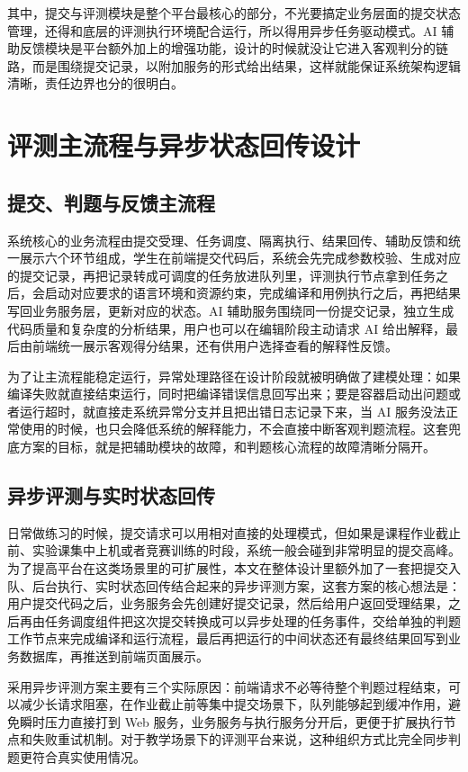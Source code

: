 其中，提交与评测模块是整个平台最核心的部分，不光要搞定业务层面的提交状态管理，还得和底层的评测执行环境配合运行，所以得用异步任务驱动模式。AI 辅助反馈模块是平台额外加上的增强功能，设计的时候就没让它进入客观判分的链路，而是围绕提交记录，以附加服务的形式给出结果，这样就能保证系统架构逻辑清晰，责任边界也分的很明白。

\section{评测主流程与异步状态回传设计}

\subsection{提交、判题与反馈主流程}

系统核心的业务流程由提交受理、任务调度、隔离执行、结果回传、辅助反馈和统一展示六个环节组成，学生在前端提交代码后，系统会先完成参数校验、生成对应的提交记录，再把记录转成可调度的任务放进队列里，评测执行节点拿到任务之后，会启动对应要求的语言环境和资源约束，完成编译和用例执行之后，再把结果写回业务服务层，更新对应的状态。AI 辅助服务围绕同一份提交记录，独立生成代码质量和复杂度的分析结果，用户也可以在编辑阶段主动请求 AI 给出解释，最后由前端统一展示客观得分结果，还有供用户选择查看的解释性反馈。

为了让主流程能稳定运行，异常处理路径在设计阶段就被明确做了建模处理：如果编译失败就直接结束运行，同时把编译错误信息回写出来；要是容器启动出问题或者运行超时，就直接走系统异常分支并且把出错日志记录下来，当 AI 服务没法正常使用的时候，也只会降低系统的解释能力，不会直接中断客观判题流程。这套兜底方案的目标，就是把辅助模块的故障，和判题核心流程的故障清晰分隔开。

\subsection{异步评测与实时状态回传}

日常做练习的时候，提交请求可以用相对直接的处理模式，但如果是课程作业截止前、实验课集中上机或者竞赛训练的时段，系统一般会碰到非常明显的提交高峰。为了提高平台在这类场景里的可扩展性，本文在整体设计里额外加了一套把提交入队、后台执行、实时状态回传结合起来的异步评测方案，这套方案的核心想法是：用户提交代码之后，业务服务会先创建好提交记录，然后给用户返回受理结果，之后再由任务调度组件把这次提交转换成可以异步处理的任务事件，交给单独的判题工作节点来完成编译和运行流程，最后再把运行的中间状态还有最终结果回写到业务数据库，再推送到前端页面展示。

采用异步评测方案主要有三个实际原因：前端请求不必等待整个判题过程结束，可以减少长请求阻塞，在作业截止前等集中提交场景下，队列能够起到缓冲作用，避免瞬时压力直接打到 Web 服务，业务服务与执行服务分开后，更便于扩展执行节点和失败重试机制。对于教学场景下的评测平台来说，这种组织方式比完全同步判题更符合真实使用情况。

